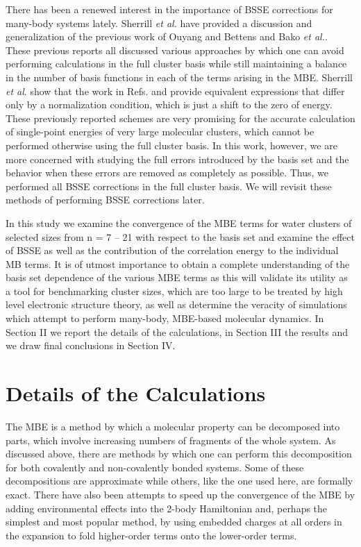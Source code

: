 \documentclass [11pt, proquest] {uwthesis}[2020/02/24]
\begin{document}
\par There has been a renewed interest in the importance of BSSE corrections for many-body systems lately. Sherrill \textit{et al.}\autocite{richard_understanding_2018} have provided a discussion and generalization of the previous work of Ouyang and Bettens\autocite{ouyang_many-body_2015} and Bako \textit{et al.}\autocite{mayer_many-body_2017}. These previous reports all discussed various approaches by which one can avoid performing calculations in the full cluster basis while still maintaining a balance in the number of basis functions in each of the terms arising in the MBE. Sherrill \textit{et al}. show that the work in Refs. \cite{ouyang_many-body_2015} and \cite{mayer_many-body_2017} provide equivalent expressions that differ only by a normalization condition, which is just a shift to the zero of energy. These previously reported schemes are very promising for the accurate calculation of single-point energies of very large molecular clusters, which cannot be performed otherwise using the full cluster basis. In this work, however, we are more concerned with studying the full errors introduced by the basis set and the behavior when these errors are removed as completely as possible. Thus, we performed all BSSE corrections in the full cluster basis. We will revisit these methods of performing BSSE corrections later. 
\par In this study we examine the convergence of the MBE terms for water clusters of selected sizes from n = 7 – 21 with respect to the basis set and examine the effect of BSSE as well as the contribution of the correlation energy to the individual MB terms. It is of utmost importance to obtain a complete understanding of the basis set dependence of the various MBE terms as this will validate its utility as a tool for benchmarking cluster sizes, which are too large to be treated by high level electronic structure theory,\autocite{richard_aiming_2014} as well as determine the veracity of simulations which attempt to perform many-body, MBE-based molecular dynamics.\autocite{liu_hydrogen-bond_2018} In Section II we report the details of the calculations, in Section III the results and we draw final conclusions in Section IV.

\section{Details of the Calculations}

\par The MBE is a method by which a molecular property can be decomposed into parts, which involve increasing numbers of fragments of the whole system. As discussed above, there are methods by which one can perform this decomposition for both covalently and non-covalently bonded systems. Some of these decompositions are approximate while others, like the one used here, are formally exact. There have also been attempts to speed up the convergence of the MBE by adding environmental effects into the 2-body Hamiltonian\autocite{gordon_effective_2001} and, perhaps the simplest and most popular method, by using embedded charges at all orders in the expansion to fold higher-order terms onto the lower-order terms.\autocite{dahlke_electrostatically_2007}
\end{document}

